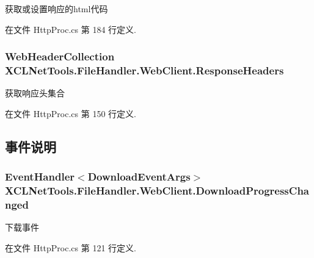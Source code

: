 获取或设置响应的html代码 



在文件 Http\-Proc.\-cs 第 184 行定义.

\hypertarget{class_x_c_l_net_tools_1_1_file_handler_1_1_web_client_a3d00d3457c23ce30274af963f4cab6bb}{
\subsubsection[{Response\-Headers}]{\setlength{\rightskip}{0pt plus 5cm}Web\-Header\-Collection X\-C\-L\-Net\-Tools.\-File\-Handler.\-Web\-Client.\-Response\-Headers\hspace{0.3cm}{\ttfamily [get]}}}\label{class_x_c_l_net_tools_1_1_file_handler_1_1_web_client_a3d00d3457c23ce30274af963f4cab6bb}


获取响应头集合 



在文件 Http\-Proc.\-cs 第 150 行定义.



\subsection{事件说明}
\hypertarget{class_x_c_l_net_tools_1_1_file_handler_1_1_web_client_aa1e50d608381b728356547eff9f80213}{
\subsubsection[{Download\-Progress\-Changed}]{\setlength{\rightskip}{0pt plus 5cm}Event\-Handler$<${\bf Download\-Event\-Args}$>$ X\-C\-L\-Net\-Tools.\-File\-Handler.\-Web\-Client.\-Download\-Progress\-Changed}}\label{class_x_c_l_net_tools_1_1_file_handler_1_1_web_client_aa1e50d608381b728356547eff9f80213}


下载事件 



在文件 Http\-Proc.\-cs 第 121 行定义.


